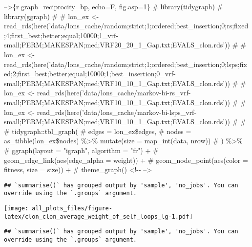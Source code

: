\documentclass[
]{article}
\begin{document}
{{{--\textgreater{}}{\{r graph\_reciprocity\_bp, echo=F, fig.asp=1\} \# library(tidygraph) \# library(ggraph) \#  \# lon\_ex \textless- read\_rds(here('data/lons\_cache/random;strict;1;ordered;best\_insertion;0;rs;fixed;4;first\_best;better;equal;10000;1\_vrf-small;PERM;MAKESPAN;med;VRF20\_20\_1\_Gap.txt;EVALS\_clon.rds')) \# \# lon\_ex \textless- read\_rds(here('data/lons\_cache/random;strict;1;ordered;best\_insertion;0;lsps;fixed;2;first\_best;better;equal;10000;1;best\_insertion;0\_vrf-small;PERM;MAKESPAN;med;VRF10\_10\_1\_Gap.txt;EVALS\_clon.rds')) \# \# lon\_ex \textless- read\_rds(here('data/lons\_cache/markov-bi-rs\_vrf-small;PERM;MAKESPAN;med;VRF10\_10\_1\_Gap.txt;EVALS\_clon.rds')) \# \# lon\_ex \textless- read\_rds(here('data/lons\_cache/markov-bi-lsps\_vrf-small;PERM;MAKESPAN;med;VRF10\_10\_1\_Gap.txt;EVALS\_clon.rds')) \#  \#  \# tidygraph::tbl\_graph( \#    edges = lon\_ex\$edges, \#    nodes = as\_tibble(lon\_ex\$nodes) \%\textgreater\% mutate(size = map\_int(data, nrow)) \#  ) \%\textgreater\% \#  ggraph(layout = "igraph", algorithm = "fr") + \#  geom\_edge\_link(aes(edge\_alpha = weight)) + \#  geom\_node\_point(aes(color = fitness, size = size)) + \#  theme\_graph() \textless!-\/- --\textgreater{}}}\label{r-graph_reciprocity_bp-echof-fig.asp1-librarytidygraph-libraryggraph-lon_ex---read_rdsheredatalons_cacherandomstrict1orderedbest_insertion0rsfixed4first_bestbetterequal100001_vrf-smallpermmakespanmedvrf20_20_1_gap.txtevals_clon.rds-lon_ex---read_rdsheredatalons_cacherandomstrict1orderedbest_insertion0lspsfixed2first_bestbetterequal100001best_insertion0_vrf-smallpermmakespanmedvrf10_10_1_gap.txtevals_clon.rds-lon_ex---read_rdsheredatalons_cachemarkov-bi-rs_vrf-smallpermmakespanmedvrf10_10_1_gap.txtevals_clon.rds-lon_ex---read_rdsheredatalons_cachemarkov-bi-lsps_vrf-smallpermmakespanmedvrf10_10_1_gap.txtevals_clon.rds-tidygraphtbl_graph-edges-lon_exedges-nodes-as_tibblelon_exnodes-mutatesize-map_intdata-nrow-ggraphlayout-igraph-algorithm-fr-geom_edge_linkaesedge_alpha-weight-geom_node_pointaescolor-fitness-size-size-theme_graph---}}

\begin{verbatim}
## `summarise()` has grouped output by 'sample', 'no_jobs'. You can override using the `.groups` argument.
\end{verbatim}

\texttt{[image: all\_plots\_files/figure-latex/clon\_clon\_average\_weight\_of\_self\_loops\_lg-1.pdf]}

\begin{verbatim}
## `summarise()` has grouped output by 'sample', 'no_jobs'. You can override using the `.groups` argument.
\end{verbatim}
\end{document}
